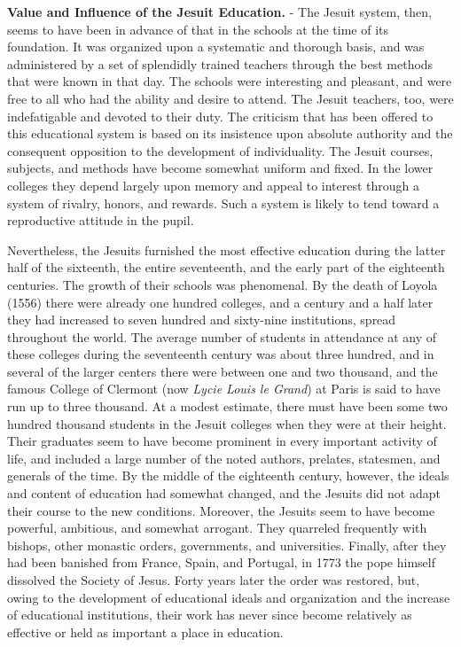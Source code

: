 \documentclass[
]{book}
\begin{document}
\textbf{Value and Influence of the Jesuit Education.} - The Jesuit system, then, seems to have been in advance of that in the schools at the time of its foundation. It was organized upon a systematic and thorough basis, and was administered by a set of splendidly trained teachers through the best methods that were known in that day. The schools were interesting and pleasant, and were free to all who had the ability and desire to attend. The Jesuit teachers, too, were indefatigable and devoted to their duty. The criticism that has been offered to this educational system is based on its insistence upon absolute authority and the consequent opposition to the development of individuality. The Jesuit courses, subjects, and methods have become somewhat uniform and fixed. In the lower colleges they depend largely upon memory and appeal to interest through a system of rivalry, honors, and rewards. Such a system is likely to tend toward a reproductive attitude in the pupil.

Nevertheless, the Jesuits furnished the most effective education during the latter half of the sixteenth, the entire seventeenth, and the early part of the eighteenth centuries. The growth of their schools was phenomenal. By the death of Loyola (1556) there were already one hundred colleges, and a century and a half later they had increased to seven hundred and sixty-nine institutions, spread throughout the world. The average number of students in attendance at any of these colleges during the seventeenth century was about three hundred, and in several of the larger centers there were between one and two thousand, and the famous College of Clermont (now \emph{Lycie Louis le Grand}) at Paris is said to have run up to three thousand. At a modest estimate, there must have been some two hundred thousand students in the Jesuit colleges when they were at their height. Their graduates seem to have become prominent in every important activity of life, and included a large number of the noted authors, prelates, statesmen, and generals of the time. By the middle of the eighteenth century, however, the ideals and content of education had somewhat changed, and the Jesuits did not adapt their course to the new conditions. Moreover, the Jesuits seem to have become powerful, ambitious, and somewhat arrogant. They quarreled frequently with bishops, other monastic orders, governments, and universities. Finally, after they had been banished from France, Spain, and Portugal, in 1773 the pope himself dissolved the Society of Jesus. Forty years later the order was restored, but, owing to the development of educational ideals and organization and the increase of educational institutions, their work has never since become relatively as effective or held as important a place in education.
\end{document}
